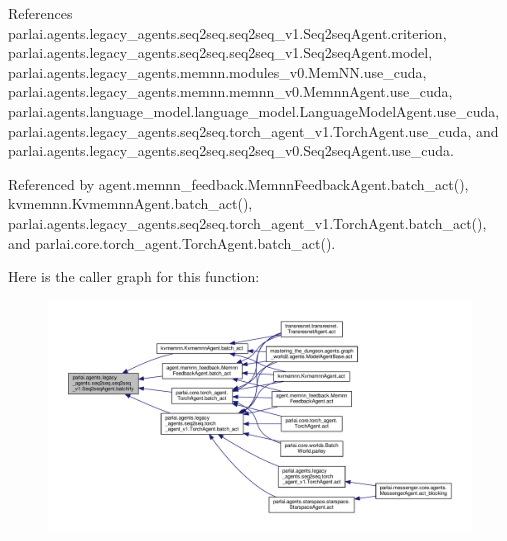 References parlai.\+agents.\+legacy\+\_\+agents.\+seq2seq.\+seq2seq\+\_\+v1.\+Seq2seq\+Agent.\+criterion, parlai.\+agents.\+legacy\+\_\+agents.\+seq2seq.\+seq2seq\+\_\+v1.\+Seq2seq\+Agent.\+model, parlai.\+agents.\+legacy\+\_\+agents.\+memnn.\+modules\+\_\+v0.\+Mem\+N\+N.\+use\+\_\+cuda, parlai.\+agents.\+legacy\+\_\+agents.\+memnn.\+memnn\+\_\+v0.\+Memnn\+Agent.\+use\+\_\+cuda, parlai.\+agents.\+language\+\_\+model.\+language\+\_\+model.\+Language\+Model\+Agent.\+use\+\_\+cuda, parlai.\+agents.\+legacy\+\_\+agents.\+seq2seq.\+torch\+\_\+agent\+\_\+v1.\+Torch\+Agent.\+use\+\_\+cuda, and parlai.\+agents.\+legacy\+\_\+agents.\+seq2seq.\+seq2seq\+\_\+v0.\+Seq2seq\+Agent.\+use\+\_\+cuda.



Referenced by agent.\+memnn\+\_\+feedback.\+Memnn\+Feedback\+Agent.\+batch\+\_\+act(), kvmemnn.\+Kvmemnn\+Agent.\+batch\+\_\+act(), parlai.\+agents.\+legacy\+\_\+agents.\+seq2seq.\+torch\+\_\+agent\+\_\+v1.\+Torch\+Agent.\+batch\+\_\+act(), and parlai.\+core.\+torch\+\_\+agent.\+Torch\+Agent.\+batch\+\_\+act().

Here is the caller graph for this function\+:
\nopagebreak
\begin{figure}[H]
\begin{center}
\leavevmode
\includegraphics[width=350pt]{classparlai_1_1agents_1_1legacy__agents_1_1seq2seq_1_1seq2seq__v1_1_1Seq2seqAgent_abb81dee41215c5d402fef970b0bf1931_icgraph}
\end{center}
\end{figure}
\mbox{\label{classparlai_1_1agents_1_1legacy__agents_1_1seq2seq_1_1seq2seq__v1_1_1Seq2seqAgent_a58227903fd44e3d436710c06457c8f84}} 
